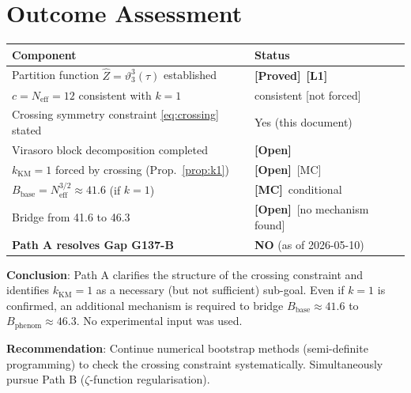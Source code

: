\documentclass[12pt,a4paper]{article}
\theoremstyle{definition}
\theoremstyle{remark}
\newcommand{\PROVED}{\textbf{[Proved]}}
\newcommand{\OPEN}{\textbf{[Open]}}
\newcommand{\MC}{\textbf{[MC]}}
\newcommand{\Lone}{\textbf{[L1]}}
\newcommand{\vth}{\vartheta}
\begin{document}
\section{Outcome Assessment}
\label{sec:outcome}

\begin{tcolorbox}[enhanced,colback=red!4!white,colframe=red!60!black,
  arc=3pt,boxrule=1.2pt,title={\textbf{Path A Outcome Assessment (2026-05-10)}}]

\begin{center}
\begin{tabular}{ll}
\toprule
\textbf{Component} & \textbf{Status} \\
\midrule
Partition function $\hat{Z} = \vth_3^3(\tau)$ established & \PROVED\ \Lone \\
$c = N_{\mathrm{eff}} = 12$ consistent with $k=1$ & consistent [not forced] \\
Crossing symmetry constraint \eqref{eq:crossing} stated & Yes (this document) \\
Virasoro block decomposition completed & \OPEN \\
$k_{\mathrm{KM}} = 1$ forced by crossing (Prop.~\ref{prop:k1}) & \OPEN\ [MC] \\
$B_{\mathrm{base}} = N_{\mathrm{eff}}^{3/2} \approx 41.6$ (if $k=1$) & \MC\ conditional \\
Bridge from 41.6 to 46.3 & \OPEN\ [no mechanism found] \\
\midrule
\textbf{Path A resolves Gap G137-B} & \textbf{NO} (as of 2026-05-10) \\
\bottomrule
\end{tabular}
\end{center}

\smallskip
\textbf{Conclusion}: Path A clarifies the structure of the crossing constraint
and identifies $k_{\mathrm{KM}} = 1$ as a necessary (but not sufficient)
sub-goal.  Even if $k = 1$ is confirmed, an additional mechanism is required
to bridge $B_{\mathrm{base}} \approx 41.6$ to $B_{\mathrm{phenom}} \approx 46.3$.
No experimental input was used.

\textbf{Recommendation}: Continue numerical bootstrap methods (semi-definite
programming) to check the crossing constraint systematically.  Simultaneously
pursue Path B ($\zeta$-function regularisation).
\end{tcolorbox}

\end{document}

